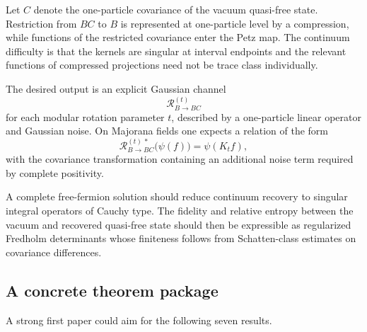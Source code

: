 \documentclass[11pt]{article}
\theoremstyle{accenttheorem}
\theoremstyle{definition}
\newcommand{\cR}{\mathcal{R}}
\newcommand{\1}{\mathbf{1}}
\begin{document}
Let \(C\) denote the one-particle covariance of the vacuum quasi-free state.  Restriction from \(BC\) to \(B\) is represented at one-particle level by a compression, while functions of the restricted covariance enter the Petz map.  The continuum difficulty is that the kernels are singular at interval endpoints and the relevant functions of compressed projections need not be trace class individually.

The desired output is an explicit Gaussian channel
\[
 \cR_{B\to BC}^{(t)}
\]
for each modular rotation parameter \(t\), described by a one-particle linear operator and Gaussian noise.  On Majorana fields one expects a relation of the form
\begin{equation}\label{eq:gaussian-field-map}
 \cR_{B\to BC}^{(t)\,*}\bigl(\psi(f)\bigr)
 =\psi(K_t f),
\end{equation}
with the covariance transformation containing an additional noise term required by complete positivity.

\begin{conjecturebox}
A complete free-fermion solution should reduce continuum recovery to singular integral operators of Cauchy type.  The fidelity and relative entropy between the vacuum and recovered quasi-free state should then be expressible as regularized Fredholm determinants whose finiteness follows from Schatten-class estimates on covariance differences.
\end{conjecturebox}

\subsection{A concrete theorem package}

A strong first paper could aim for the following seven results.
\end{document}
